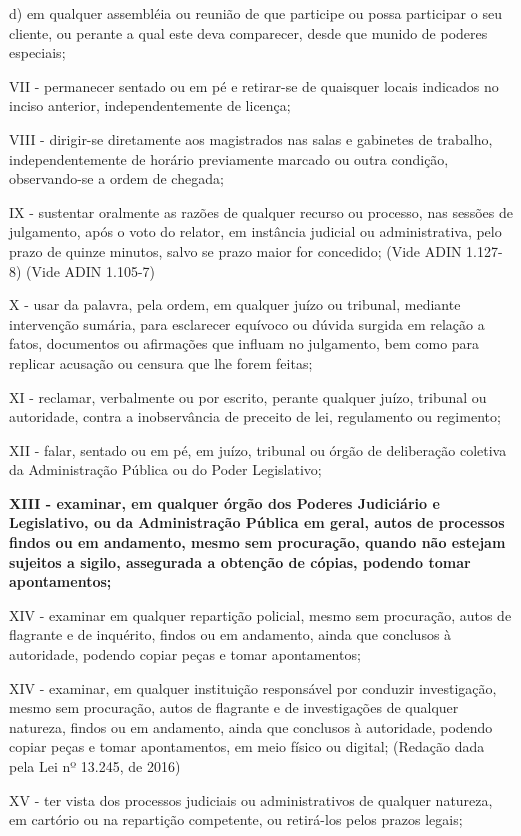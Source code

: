 \documentclass[12pt]{article}
\begin{document}
d) em qualquer assembléia ou reunião de que participe ou possa participar o seu cliente, ou perante a qual este deva comparecer, desde que munido de poderes especiais;

VII - permanecer sentado ou em pé e retirar-se de quaisquer locais indicados no inciso anterior, independentemente de licença;

VIII - dirigir-se diretamente aos magistrados nas salas e gabinetes de trabalho, independentemente de horário previamente marcado ou outra condição, observando-se a ordem de chegada;

IX - sustentar oralmente as razões de qualquer recurso ou processo, nas sessões de julgamento, após o voto do relator, em instância judicial ou administrativa, pelo prazo de quinze minutos, salvo se prazo maior for concedido;       (Vide ADIN 1.127-8)      (Vide ADIN 1.105-7)

X - usar da palavra, pela ordem, em qualquer juízo ou tribunal, mediante intervenção sumária, para esclarecer equívoco ou dúvida surgida em relação a fatos, documentos ou afirmações que influam no julgamento, bem como para replicar acusação ou censura que lhe forem feitas;

XI - reclamar, verbalmente ou por escrito, perante qualquer juízo, tribunal ou autoridade, contra a inobservância de preceito de lei, regulamento ou regimento;

XII - falar, sentado ou em pé, em juízo, tribunal ou órgão de deliberação coletiva da Administração Pública ou do Poder Legislativo;

\textbf{XIII - examinar, em qualquer órgão dos Poderes Judiciário e Legislativo, ou da Administração Pública em geral, autos de processos findos ou em andamento, mesmo sem procuração, quando não estejam sujeitos a sigilo, assegurada a obtenção de cópias, podendo tomar apontamentos;}

XIV - examinar em qualquer repartição policial, mesmo sem procuração, autos de flagrante e de inquérito, findos ou em andamento, ainda que conclusos à autoridade, podendo copiar peças e tomar apontamentos;

XIV - examinar, em qualquer instituição responsável por conduzir investigação, mesmo sem procuração, autos de flagrante e de investigações de qualquer natureza, findos ou em andamento, ainda que conclusos à autoridade, podendo copiar peças e tomar apontamentos, em meio físico ou digital;         (Redação dada pela Lei nº 13.245, de 2016)

XV - ter vista dos processos judiciais ou administrativos de qualquer natureza, em cartório ou na repartição competente, ou retirá-los pelos prazos legais;
\end{document}
